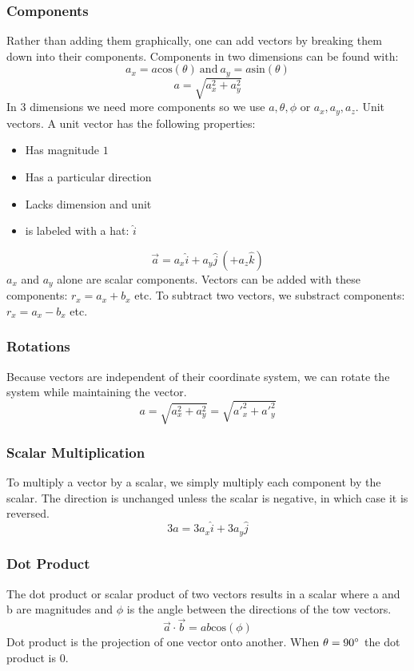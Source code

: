 \documentclass[12pt]{report}
\begin{document}
\begin{flushleft}
\subsubsection*{Components}

Rather than adding them graphically, one can add vectors by breaking them down into their
components. Components in two dimensions can be found with:
\[a_x = a \mathrm{cos}(\theta) \:\mathrm{and}\: a_y = a \mathrm{sin}(\theta)\]
\[a = \sqrt{a^2_x + a^2_y}\]
In \(3\) dimensions we need more components so we use \(a, \theta, \phi\) or \(a_x, a_y, a_z\). 
Unit vectors. A unit vector has the following properties:
\begin{itemize}
    \item Has magnitude \(1\)
    \item Has a particular direction
    \item Lacks dimension and unit
    \item is labeled with a hat: \(\hat{i}\)
\end{itemize}
\[\vec{a} = a_x\hat{i} + a_y\hat{j}\ (+ a_z\hat{k})\]
\(a_x\) and \(a_y\) alone are scalar components. Vectors can be added with these components:
\(r_x = a_x + b_x\) etc. To subtract two vectors, we substract components: \(r_x = a_x - b_x\) etc.

\subsubsection*{Rotations}

Because vectors are independent of their coordinate system, we can rotate the system while
maintaining the vector.
\[a = \sqrt{a^2_x + a^2_y} = \sqrt{a'^2_x + a'^2_y}\]

\subsubsection*{Scalar Multiplication}

To multiply a vector by a scalar, we simply multiply each component by the scalar. The direction
is unchanged unless the scalar is negative, in which case it is reversed.
\[3a = 3a_x\hat{i} + 3a_y\hat{j}\]

\subsubsection*{Dot Product}

The dot product or scalar product of two vectors results in a scalar where a and b are magnitudes and
\(\phi\) is the angle between the directions of the tow vectors.
\[\vec{a} \cdot \vec{b} = ab\mathrm{cos}(\phi)\]
Dot product is the projection of one vector onto another. When \(\theta = 90\degree\) the dot product
is \(0\).


\end{flushleft}
\end{document}
